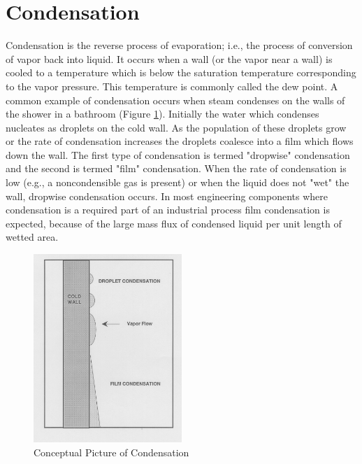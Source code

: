 \section{Condensation}

Condensation is the reverse process of evaporation; i.e., the process of conversion of vapor back into liquid.
It occurs when a wall (or the vapor near a wall) is cooled to a temperature which is below the saturation temperature corresponding to the vapor pressure.
This temperature is commonly called the dew point.
A common example of condensation occurs when steam condenses on the walls of the shower in a bathroom (Figure \ref{fig:condensation}).
Initially the water which condenses nucleates as droplets on the cold wall.
As the population of these droplets grow or the rate of condensation increases the droplets coalesce into a film which flows down the wall.
The first type of condensation is termed "dropwise" condensation and the second is termed "film" condensation. 
When the rate of condensation is low (e.g., a noncondensible gas is present) or when the liquid does not "wet" the wall, dropwise condensation occurs.
In most engineering components where condensation is a required part of an industrial process film condensation is expected, because of the large mass flux of condensed liquid per unit length of wetted area.

\begin{figure}[h]
\includegraphics[width=0.5\textwidth]{images/condensation.png}
\caption{Conceptual Picture of Condensation}
\label{fig:condensation}
\end{figure}


